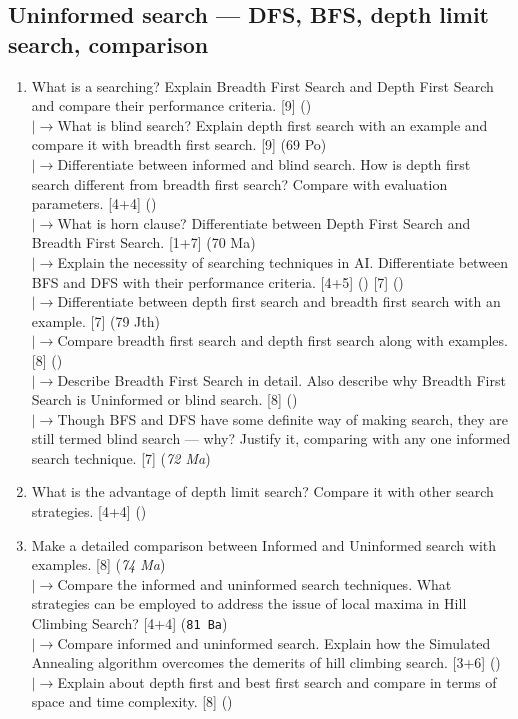 \documentclass[12pt]{article}
\newcommand{\lb}{\\$\left|\rightarrow\right.$}
\begin{document}
  \subsection{Uninformed search --- DFS, BFS, depth limit search, comparison}
    \begin{enumerate}[topsep=0pt, noitemsep]
      \item What is a searching? Explain Breadth First Search and Depth First Search and compare their performance criteria. \hfill [9] ()
        \lb What is blind search? Explain depth first search with an example and compare it with breadth first search. \hfill [9] (69 Po)
        \lb Differentiate between informed and blind search. How is depth first search different from breadth first search? Compare with evaluation parameters. \hfill [4+4] ()
        \lb What is horn clause? Differentiate between Depth First Search and Breadth First Search. \hfill [1+7] (70 Ma)
        \lb Explain the necessity of searching techniques in AI. Differentiate between BFS and DFS with their performance criteria. \hfill [4+5] () [7] ()
        \lb Differentiate between depth first search and breadth first search with an example. \hfill [7] (79 Jth)
        \lb Compare breadth first search and depth first search along with examples. \hfill [8] ()
        \lb Describe Breadth First Search in detail. Also describe why Breadth First Search is Uninformed or blind search. \hfill [8] ()
        \lb Though BFS and DFS have some definite way of making search, they are still termed blind search --- why? Justify it, comparing with any one informed search technique. \hfill [7] (\textit{72 Ma})

      \item What is the advantage of depth limit search? Compare it with other search strategies. \hfill [4+4] ()

      \item Make a detailed comparison between Informed and Uninformed search with examples. \hfill [8] (\textit{74 Ma})
        \lb Compare the informed and uninformed search techniques. What strategies can be employed to address the issue of local maxima in Hill Climbing Search? \hfill [4+4] (\texttt{81 Ba})
        \lb Compare informed and uninformed search. Explain how the Simulated Annealing algorithm overcomes the demerits of hill climbing search. \hfill [3+6] ()
        \lb Explain about depth first and best first search and compare in terms of space and time complexity. \hfill [8] ()
    \end{enumerate}
\end{document}
